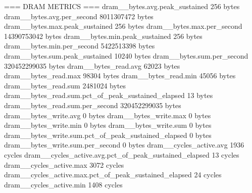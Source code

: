 === DRAM METRICS ===
dram__bytes.avg.peak_sustained                                                               256 bytes
dram__bytes.avg.per_second                                                            8011307472 bytes
dram__bytes.max.peak_sustained                                                               256 bytes
dram__bytes.max.per_second                                                           14390753042 bytes
dram__bytes.min.peak_sustained                                                               256 bytes
dram__bytes.min.per_second                                                            5422513398 bytes
dram__bytes.sum.peak_sustained                                                             10240 bytes
dram__bytes.sum.per_second                                                          320452299035 bytes
dram__bytes_read.avg                                                                       62023 bytes
dram__bytes_read.max                                                                       98304 bytes
dram__bytes_read.min                                                                       45056 bytes
dram__bytes_read.sum                                                                     2481024 bytes
dram__bytes_read.sum.pct_of_peak_sustained_elapsed                                            13 bytes
dram__bytes_read.sum.per_second                                                     320452299035 bytes
dram__bytes_write.avg                                                                          0 bytes
dram__bytes_write.max                                                                          0 bytes
dram__bytes_write.min                                                                          0 bytes
dram__bytes_write.sum                                                                          0 bytes
dram__bytes_write.sum.pct_of_peak_sustained_elapsed                                            0 bytes
dram__bytes_write.sum.per_second                                                               0 bytes
dram__cycles_active.avg                                                                     1936 cycles
dram__cycles_active.avg.pct_of_peak_sustained_elapsed                                         13 cycles
dram__cycles_active.max                                                                     3072 cycles
dram__cycles_active.max.pct_of_peak_sustained_elapsed                                         24 cycles
dram__cycles_active.min                                                                     1408 cycles
